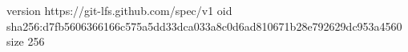 version https://git-lfs.github.com/spec/v1
oid sha256:d7fb5606366166c575a5dd33dca033a8c0d6ad810671b28e792629dc953a4560
size 256
